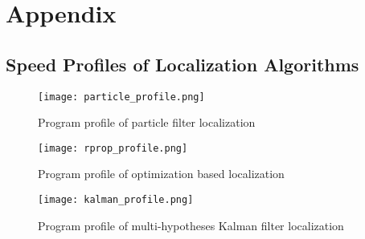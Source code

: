 \chapter{Appendix}\label{testdat}

\section{Speed Profiles of Localization Algorithms}\label{sec:profiles}
\begin{figure}[h!]
  \texttt{[image: particle\_profile.png]}
    \caption{Program profile of particle filter localization}
    \label{fig:profile_partcile}
\end{figure}

\begin{figure}[h!]
  \texttt{[image: rprop\_profile.png]}
    \caption{Program profile of optimization based localization}
    \label{fig:profile_rprop}
\end{figure}

\begin{figure}[h!]
  \texttt{[image: kalman\_profile.png]}
    \caption{Program profile of multi-hypotheses Kalman filter localization}
    \label{fig:profile_kalman}
\end{figure}


